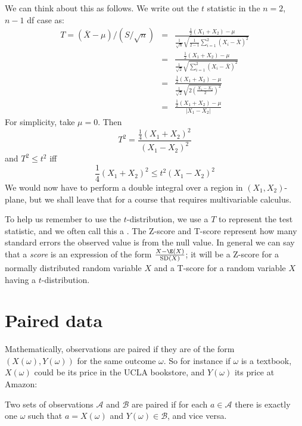 We can think about this as follows. We write out the $t$ statistic in the $n=2$, $n-1$ df case as:
\begin{eqnarray*}
T=(\overline X-\mu)/(S/\sqrt{n}) &=& \frac{\frac12(X_1+X_2)-\mu}{\frac1{\sqrt n}\sqrt{ \frac1{2-1}\sum_{i=1}^2 (X_i-\bar X)^2}}\\
&=&\frac{\frac12(X_1+X_2)-\mu}{\frac1{\sqrt 2}\sqrt{\sum_{i=1}^2 (X_i-\bar X)^2}}\\
&=&\frac{\frac12(X_1+X_2)-\mu}{\frac1{\sqrt 2}\sqrt{2(\frac{X_1-X_2}2)^2}}\\
&=& \frac{\frac12(X_1+X_2)-\mu}{|X_1-X_2|}
\end{eqnarray*}
For simplicity, take $\mu=0$. Then
\[
	T^2 = \frac{\frac14(X_1+X_2)^2}{(X_1-X_2)^2}
\]
and $T^2\le t^2$ iff
\[
	\frac14(X_1+X_2)^2\le t^2(X_1-X_2)^2
\]
We would now have to perform a double integral over a region in $(X_1,X_2)$-plane, but we shall leave that for a course that requires multivariable calculus.



\label{oneSampleTTests}


\begin{termBox}{
To help us remember to use the $t$-distribution, we use a $T$ to represent the test statistic, and we often call this a . The Z-score and T-score represent how many standard errors the observed value is from the null value. In general we can say that a \emph{score} is an expression of the form $\frac{X-\E(X)}{\mathrm{SD}(X)}$; it will be a Z-score for a normally distributed random variable $X$ and a T-score for a random variable $X$ having a $t$-distribution.}
\end{termBox}



\section{Paired data}
\label{pairedData}



Mathematically, observations are paired if they are of the form $(X(\omega),Y(\omega))$ for the same outcome $\omega$. So for instance if $\omega$ is a textbook, $X(\omega)$ could be its price in the UCLA bookstore, and $Y(\omega)$ its price at Amazon:
\begin{df}
Two sets of observations $\mathcal A$ and $\mathcal B$ are paired if for each $a\in\mathcal A$ there is exactly one $\omega$ such that $a=X(\omega)$ and $Y(\omega)\in \mathcal B$, and vice versa.
\end{df}

